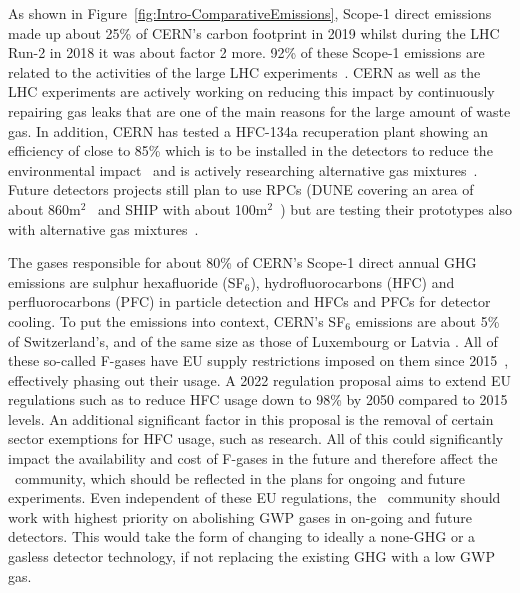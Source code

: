 \documentclass[../SustainableHEP.tex]{subfiles}
\begin{document}
As shown in Figure~\ref{fig:Intro-ComparativeEmissions}, Scope-1 direct emissions made up about 25\% of CERN's carbon footprint in 2019 whilst during the LHC Run-2 in 2018 it was about factor 2 more.  92\% of these Scope-1 emissions are related to the activities of the large LHC experiments~\cite{Environment:2737239,envrep2020}. CERN as well as the LHC experiments are actively working on reducing this impact by continuously repairing gas leaks that are one of the main reasons for the large amount of waste gas. In addition, CERN has tested a HFC-134a recuperation plant showing an efficiency of close to 85\% which is to be installed in the detectors to reduce the environmental impact~\cite{envrep2020} and is actively researching alternative gas mixtures~\cite{Mandelli:2022qjc}. Future detectors projects still plan to use RPCs (DUNE covering an area of about 860m$^2$~\cite{DUNE:2016rla} and SHIP with about 100m$^2$~\cite{SHiP:2021nfo}) but are testing their prototypes also with alternative gas mixtures~\cite{Albanese_2023}.  

The gases responsible for about 80\% of CERN's Scope-1 direct annual GHG emissions are sulphur hexafluoride (SF$_6$), hydrofluorocarbons (HFC) and perfluorocarbons (PFC) in particle detection and HFCs and PFCs for detector cooling. To put the emissions into context, CERN's SF$_6$ emissions are about 5\% of Switzerland's, and of the same size as those of Luxembourg or Latvia \cite{SF6data}. All of these so-called F-gases have EU supply restrictions imposed on them since 2015~\cite{EUFgasregulation}, effectively phasing out their usage. A 2022 regulation proposal aims to extend EU regulations such as to reduce HFC usage down to 98\% by 2050 compared to 2015 levels. An additional significant factor in this proposal is the removal of certain sector exemptions for HFC usage, such as research. All of this could significantly impact the availability and cost of F-gases in the future and therefore affect the \ACR\ community, which should be reflected in the plans for ongoing and future experiments. Even independent of these EU regulations, the \ACR\ community should work with highest priority on abolishing GWP gases in on-going and future detectors. This would take the form of changing to ideally a none-GHG or a gasless detector technology, if not replacing the existing GHG with a low GWP gas.
\end{document}

